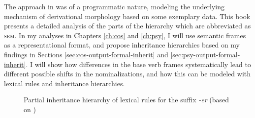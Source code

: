 The approach in \citet{Plag.2018} was of a programmatic nature, modeling the underlying mechanism of derivational morphology based on some exemplary data. This book presents a detailed analysis of the parts of the hierarchy which are abbreviated as \textsc{sem}. 
In my analyses in Chapters \ref{ch:cos} and \ref{ch:psy}, I will use semantic frames as a representational format, and propose inheritance hierarchies based on my findings in Sections \ref{sec:cos-output-formal-inherit} and \ref{sec:psy-output-formal-inherit}. I will show how differences in the base verb frames systematically lead to different possible shifts in the nominalizations, and how this can be modeled with lexical rules and inheritance hierarchies. 

\begin{figure} \centering \singlespacing
	\caption[Partial inheritance hierarchy of lexical rules for the suffix \textit{-er}]{Partial inheritance hierarchy of lexical rules for the suffix \textit{-er} (based on \citealt{Plag.2018})}
	\label{fig:inheritancewalker}
\end{figure}
